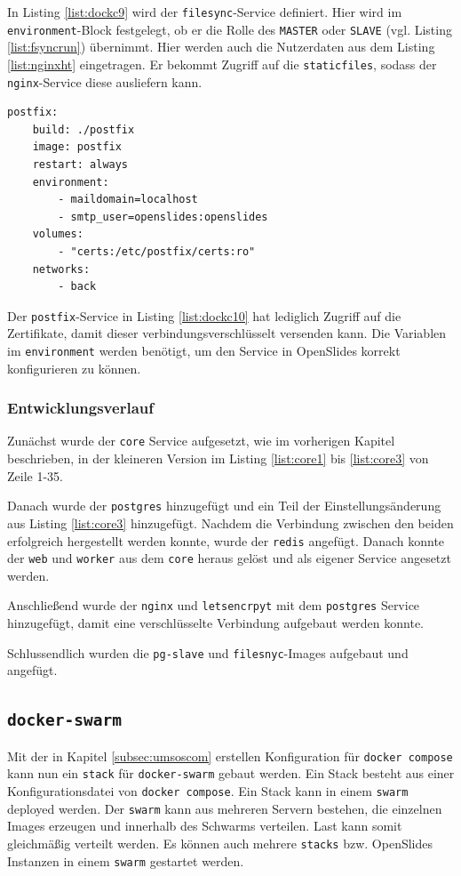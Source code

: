 \documentclass[11pt,a4paper]{article}
\begin{document}
In Listing \ref{list:dockc9} wird der \texttt{filesync}-Service definiert. Hier 
wird im \texttt{environment}-Block festgelegt, ob er die Rolle des 
\texttt{MASTER} oder \texttt{SLAVE} (vgl. Listing \ref{list:fsyncrun}) 
übernimmt. Hier werden auch die Nutzerdaten aus dem Listing \ref{list:nginxht} 
eingetragen. Er bekommt Zugriff auf die \texttt{staticfiles}, sodass der 
\texttt{nginx}-Service diese ausliefern kann.
\begin{lstlisting}[firstnumber=141,
	caption=\texttt{docker-compose.yml} Teil 10 - 
	\cite{osdockcont},
	label={list:dockc10}]
postfix:
	build: ./postfix
	image: postfix
	restart: always
	environment:
		- maildomain=localhost 
		- smtp_user=openslides:openslides
	volumes:
		- "certs:/etc/postfix/certs:ro"
	networks:
		- back
\end{lstlisting}
Der \texttt{postfix}-Service in Listing \ref{list:dockc10} hat lediglich 
Zugriff auf die Zertifikate, damit dieser verbindungsverschlüsselt versenden 
kann. Die Variablen im \texttt{environment} werden benötigt, um den Service in 
OpenSlides korrekt konfigurieren zu können.
\subsubsection{Entwicklungsverlauf}
Zunächst wurde der \texttt{core} Service aufgesetzt, wie im vorherigen Kapitel 
beschrieben, in der kleineren Version im Listing \ref{list:core1} bis 
\ref{list:core3} von Zeile 1-35.

Danach wurde der \texttt{postgres} hinzugefügt und ein Teil der 
Einstellungsänderung aus Listing \ref{list:core3} hinzugefügt. Nachdem die 
Verbindung zwischen den beiden erfolgreich hergestellt werden konnte, wurde der 
\texttt{redis} angefügt. Danach konnte der \texttt{web} und \texttt{worker} aus 
dem \texttt{core} heraus gelöst und als eigener Service angesetzt werden.

Anschließend wurde der \texttt{nginx} und \texttt{letsencrpyt} mit dem 
\texttt{postgres} Service hinzugefügt, damit eine verschlüsselte Verbindung 
aufgebaut werden konnte.

Schlussendlich wurden die \texttt{pg-slave} und \texttt{filesnyc}-Images 
aufgebaut und angefügt.
\clearpage
\subsection{\texttt{docker-swarm}}
\label{subsec:umsds}
Mit der in Kapitel \ref{subsec:umsoscom} erstellen Konfiguration für 
\texttt{docker compose} kann nun ein \texttt{stack} für \texttt{docker-swarm} 
gebaut werden. Ein Stack besteht aus einer Konfigurationsdatei von 
\texttt{docker compose}. Ein Stack kann in einem \texttt{swarm} deployed 
werden. Der \texttt{swarm} kann aus mehreren Servern bestehen, die 
einzelnen Images erzeugen und innerhalb des Schwarms verteilen. Last kann 
somit gleichmäßig verteilt werden. Es können auch mehrere \texttt{stacks} bzw. 
OpenSlides Instanzen in einem \texttt{swarm} gestartet werden.
\end{document}
